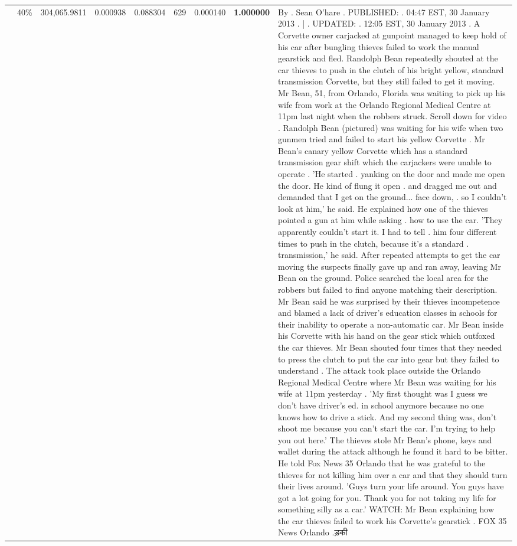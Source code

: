\begin{table}[H]
\begin{tabular}{llrrrrrrl}
 & 40\% & 304,065.9811 & 0.000938 & 0.088304 & \color{red} 629 & 0.000140 & \bfseries \color{red} 1.000000 & By . Sean O'hare . PUBLISHED: . 04:47 EST, 30 January 2013 . | . UPDATED: . 12:05 EST, 30 January 2013 . A Corvette owner carjacked at gunpoint managed to keep hold of his car after bungling thieves failed to work the manual gearstick and fled. Randolph Bean repeatedly shouted at the car thieves to push in the clutch of his bright yellow, standard transmission Corvette, but they still failed to get it moving. Mr Bean, 51, from Orlando, Florida was waiting to pick up his wife from work at the Orlando Regional Medical Centre at 11pm last night when the robbers struck. Scroll down for video . Randolph Bean (pictured) was waiting for his wife when two gunmen tried and failed to start his yellow Corvette . Mr Bean's canary yellow Corvette which has a standard transmission gear shift which the carjackers were unable to operate . 'He started . yanking on the door and made me open the door. He kind of flung it open . and dragged me out and demanded that I get on the ground... face down, . so I couldn't look at him,' he said. He explained how one of the thieves pointed a gun at him while asking . how to use the car. 'They apparently couldn't start it. I had to tell . him four different times to push in the clutch, because it's a standard . transmission,' he said. After repeated attempts to get the car moving the suspects finally gave up and ran away, leaving Mr Bean on the ground. Police searched the local area for the robbers but failed to find anyone matching their description. Mr Bean said he was surprised by their thieves incompetence and blamed a lack of driver's education classes in schools for their inability to operate a non-automatic car. Mr Bean inside his Corvette with his hand on the gear stick which outfoxed the car thieves. Mr Bean shouted four times that they needed to press the clutch to put the car into gear but they failed to understand . The attack took place outside the Orlando Regional Medical Centre where Mr Bean was waiting for his wife at 11pm yesterday . 'My first thought was I guess we don't have driver's ed. in school anymore because no one knows how to drive a stick. And my second thing was, don't shoot me because you can't start the car. I'm trying to help you out here.' The thieves stole Mr Bean's phone, keys and wallet during the attack although he found it hard to be bitter. He told Fox News 35 Orlando that he was grateful to the thieves for not killing him over a car and that they should turn their lives around. 'Guys turn your life around. You guys have got a lot going for you. Thank you for not taking my life for something silly as a car.' WATCH: Mr Bean explaining how the car thieves failed to work his Corvette's gearstick . FOX 35 News Orlando .ड़की \\

\end{tabular}
\end{table}
